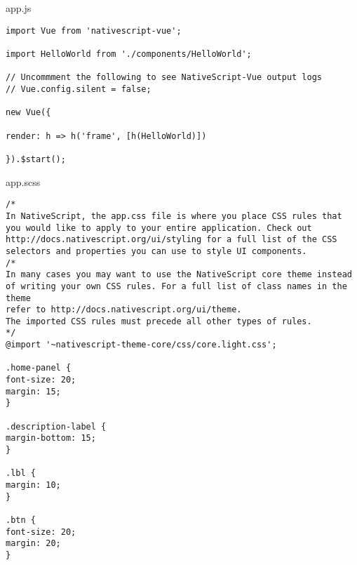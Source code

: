 \chapter{}
\label{ch:broncode_app}
app.js
\begin{lstlisting}
import Vue from 'nativescript-vue';

import HelloWorld from './components/HelloWorld';

// Uncommment the following to see NativeScript-Vue output logs
// Vue.config.silent = false;

new Vue({

render: h => h('frame', [h(HelloWorld)])

}).$start();
\end{lstlisting}
app.scss
\begin{lstlisting}
/*
In NativeScript, the app.css file is where you place CSS rules that
you would like to apply to your entire application. Check out
http://docs.nativescript.org/ui/styling for a full list of the CSS
selectors and properties you can use to style UI components.
/*
In many cases you may want to use the NativeScript core theme instead
of writing your own CSS rules. For a full list of class names in the theme
refer to http://docs.nativescript.org/ui/theme.
The imported CSS rules must precede all other types of rules.
*/
@import '~nativescript-theme-core/css/core.light.css';

.home-panel {
font-size: 20;
margin: 15;
}

.description-label {
margin-bottom: 15;
}

.lbl {
margin: 10;
}

.btn {
font-size: 20;
margin: 20;
}
\end{lstlisting}
